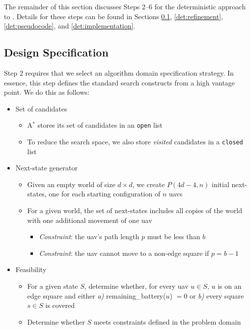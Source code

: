 \documentclass[../main.tex]{subfiles}
\begin{document}
The remainder of this section discusses Steps 2--6 for the deterministic approach to \prob. Details for these steps can be found in Sections \ref{det:specification}, \ref{det:refinement}, \ref{det:pseudocode}, and \ref{det:implementation}.

\subsection{Design Specification}\label{det:specification}

Step 2 requires that we select an algorithm domain specification strategy. In essence, this step defines the standard search constructs from a high vantage point. We do this as follows:

\begin{itemize}
    \item Set of candidates
    \begin{itemize}
        \item A$^*$ stores its set of candidates in an \texttt{open} list
        \item To reduce the search space, we also store \textit{visited} candidates in a \texttt{closed} list
    \end{itemize}
    
    \item Next-state generator
    \begin{itemize}
        \item Given an empty world of size $d\times d$, we create $P(4d-4,n)$ initial next-states, one for each starting configuration of $n$ \acp{uav}
        \item For a given world, the set of next-states includes all copies of the world with one additional movement of one \ac{uav}
        \begin{itemize}
            \item \textit{Constraint}: the \ac{uav}'s path length $p$ must be less than $b$
            \item \textit{Constraint}: the \ac{uav} cannot move to a non-edge square if $p=b-1$
        \end{itemize}
    
    \end{itemize}
    
    \item Feasibility
    \begin{itemize}
        \item For a given state $S$, determine whether, for every \ac{uav} $u\in S$, $u$ is on an edge square and either \textit{a)} remaining\_battery($u$) $=0$ or \textit{b)} every square $s\in S$ is covered
        \item Determine whether $S$ meets constraints defined in the problem domain
    \end{itemize}


\end{itemize}
\end{document}
